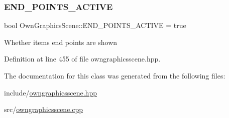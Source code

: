 \subsubsection{\texorpdfstring{E\+N\+D\+\_\+\+P\+O\+I\+N\+T\+S\+\_\+\+A\+C\+T\+I\+VE}{END\_POINTS\_ACTIVE}}
{\footnotesize\ttfamily bool Own\+Graphics\+Scene\+::\+E\+N\+D\+\_\+\+P\+O\+I\+N\+T\+S\+\_\+\+A\+C\+T\+I\+VE = true\hspace{0.3cm}{\ttfamily [static]}}

Whether items end points are shown 

Definition at line 455 of file owngraphicsscene.\+hpp.



The documentation for this class was generated from the following files\+:\begin{DoxyCompactItemize}
\item 
include/\mbox{\hyperlink{owngraphicsscene_8hpp}{owngraphicsscene.\+hpp}}\item 
src/\mbox{\hyperlink{owngraphicsscene_8cpp}{owngraphicsscene.\+cpp}}\end{DoxyCompactItemize}
